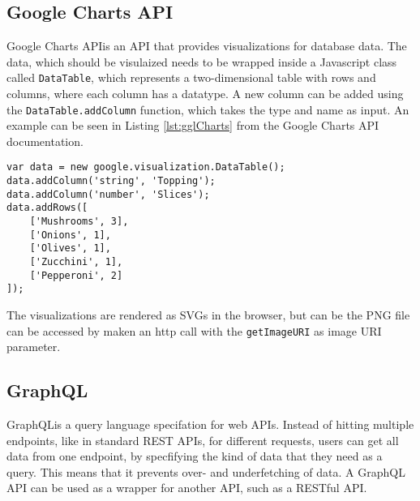 \subsection{Google Charts API}
Google Charts API\footnotemark is an API that provides visualizations for database data. The data, which should be visulaized needs to be wrapped inside a Javascript class called \texttt{DataTable}, which represents a two-dimensional table with rows and columns, where each column has a datatype.
A new column can be added using the \texttt{DataTable.addColumn} function, which takes the type and name as input. An example can be seen in Listing \ref{lst:gglCharts} from the Google Charts API documentation\footnotemark[\value{footnote}].

\begin{lstlisting}[caption=Example use of the DataTable class,captionpos=b,label={lst:gglCharts}]
var data = new google.visualization.DataTable();
data.addColumn('string', 'Topping');
data.addColumn('number', 'Slices');
data.addRows([
	['Mushrooms', 3],
	['Onions', 1],
	['Olives', 1], 
	['Zucchini', 1],
	['Pepperoni', 2]
]);
\end{lstlisting}

The visualizations are rendered as SVGs in the browser, but can be the PNG file can be accessed by maken an http call with the \texttt{getImageURI} as image URI parameter.


\subsection{GraphQL}
GraphQL\footnotemark is a query language specifation for web APIs.
Instead of hitting multiple endpoints, like in standard REST APIs, for different requests, users can get all data from one endpoint, by specfifying the kind of data that they need as a query. This means that it prevents over- and underfetching of data.\footnotemark
{} A GraphQL API can be used as a wrapper for another API, such as a RESTful API.

